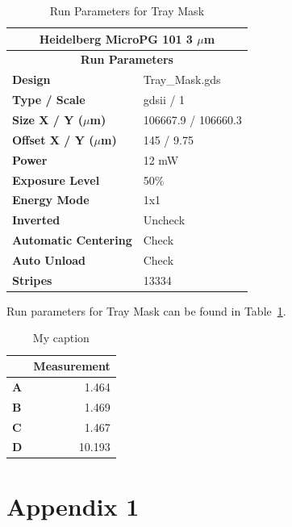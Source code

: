 \documentclass[12pt]{article}
\numberwithin{equation}{section}
\numberwithin{table}{section}
\numberwithin{figure}{section}
\begin{document}
\begin{table}[]
\centering
\caption{Run Parameters for Tray Mask}
\label{TM}
\begin{tabular}{@{}ll@{}}
\toprule
\multicolumn{2}{c}{\textbf{Heidelberg MicroPG 101 3 $\mu$m}} \\ \midrule
\multicolumn{2}{c}{\textbf{Run Parameters}} \\
\textbf{Design} & Tray\_Mask.gds \\
\textbf{Type / Scale} & gdsii / 1 \\
\textbf{Size X / Y ($\mu$m)} & 106667.9 / 106660.3 \\
\textbf{Offset X / Y ($\mu$m)} & 145 / 9.75 \\
\textbf{Power} & 12 mW \\
\textbf{Exposure Level} & 50\% \\
\textbf{Energy Mode} & 1x1 \\
\textbf{Inverted} & Uncheck \\
\textbf{Automatic Centering} & Check \\
\textbf{Auto Unload} & Check \\
\textbf{Stripes} & 13334 \\ \bottomrule
\end{tabular}
\end{table}

Run parameters for Tray Mask can be found in Table~\ref{TM}.

\begin{table}[]
\centering
\caption{My caption}
\label{my-label}
\begin{tabular}{@{}lr@{}}
\toprule
 & \multicolumn{1}{l}{\textbf{Measurement}} \\ \midrule
\textbf{A} & 1.464 \\
\textbf{B} & 1.469 \\
\textbf{C} & 1.467 \\
\textbf{D} & 10.193 \\ \bottomrule
\end{tabular}
\end{table}

 
\appendix

\section{Appendix 1} 
\label{appendix_1}
\end{document}
